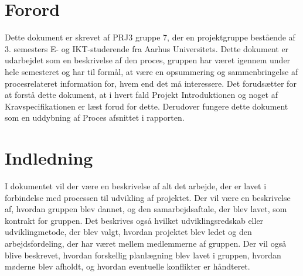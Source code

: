 \documentclass[a4paper,12pt,fleqn,oneside]{article}
\begin{document}

\newpage
\tableofcontents
\newpage

\section{Forord}
Dette dokument er skrevet af PRJ3 gruppe 7, der en projektgruppe bestående af 3. semesters E- og IKT-studerende fra Aarhus Universitets. Dette dokument er udarbejdet som en beskrivelse af den proces, gruppen har været igennem under hele semesteret og har til formål, at være en opsummering og sammenbringelse af procesrelateret information for, hvem end det må interessere. Det forudsætter for at forstå dette dokument, at i hvert fald Projekt Introduktionen og noget af Kravspecifikationen er læst forud for dette. Derudover fungere dette dokument som en uddybning af Proces afsnittet i rapporten.

\section{Indledning}
I dokumentet vil der være en beskrivelse af alt det arbejde, der er lavet i forbindelse med processen til udvikling af projektet. Der vil være en beskrivelse af, hvordan gruppen blev dannet, og den samarbejdsaftale, der blev lavet, som kontrakt for gruppen. Det beskrives også hvilket udviklingsredskab eller udviklingmetode, der blev valgt, hvordan projektet blev ledet og den arbejdsfordeling, der har været mellem medlemmerne af gruppen. Der vil også blive beskrevet, hvordan forskellig planlægning blev lavet i gruppen, hvordan møderne blev afholdt, og hvordan eventuelle konflikter er håndteret.
\end{document}
